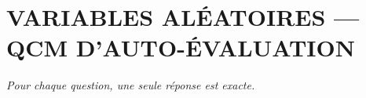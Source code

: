 
\section*{\textcolor{chapcolor}{\MakeUppercase{Variables aléatoires — QCM d'auto-évaluation}}}

\begin{center}
\textit{Pour chaque question, une seule réponse est exacte.}
\end{center}

